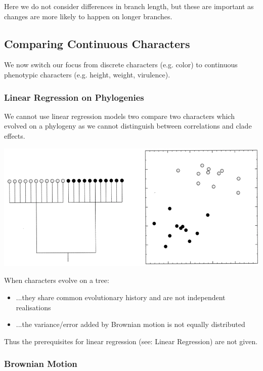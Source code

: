 \documentclass{article}
\begin{document}
\begin{multicols*}{3}
Here we do not consider differences in branch length, but these are important as changes are more likely to happen on longer branches. 

\subsection{Comparing Continuous Characters}

We now switch our focus from discrete characters (e.g. color) to continuous phenotypic characters (e.g. height, weight, virulence). 

\subsubsection{Linear Regression on Phylogenies}

We cannot use linear regression models two compare two characters which evolved on a phylogeny as we cannot distinguish between correlations and clade effects. 

\begin{center}
    \includegraphics[width=1\linewidth, angle=0.0]{phyloregress.png}
\end{center}

When characters evolve on a tree:

\begin{itemize}
    \item ...they share common evolutionary history and are not independent realisations
    \item ...the variance/error added by Brownian motion is not equally distributed 
\end{itemize}

Thus the prerequisites for linear regression (see: {\color{astral}Linear Regression}) are not given.  
\subsubsection{Brownian Motion}


\end{multicols*}
\end{document}

